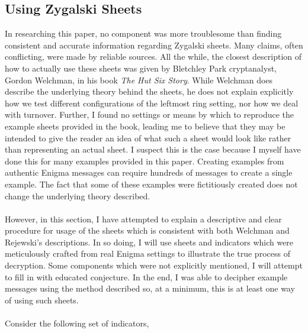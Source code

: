 \subsection{Using Zygalski Sheets}
In researching this paper, no component was more troublesome than
finding consistent and accurate information regarding Zygalski
sheets. Many claims, often conflicting, were made by reliable
sources. All the while, the closest description of how to actually
use these sheets was given by Bletchley Park cryptanalyst, Gordon
Welchman, in his book \emph{The
Hut Six Story}. While Welchman does describe the underlying theory
behind the sheets, he does not explain explicitly how we test
different configurations of the leftmost ring setting, nor how we
deal with turnover. Further, I found no settings or means by which to
reproduce the example sheets provided in the book, leading me to
believe that they may be intended to give the reader an idea of what
such a sheet would look like rather than representing an actual
sheet. I suspect this is the case because I myself have done this for
many examples provided in this paper. Creating examples from
authentic Enigma messages can require hundreds of messages to create
a single example. The fact that some of these examples were
fictitiously created does not change the underlying theory described.
\\\\However, in this section, I have attempted to explain a
descriptive and clear procedure for usage of the sheets which is
consistent with both Welchman and Rejewski's descriptions. In so doing, I
will use sheets and indicators which were meticulously crafted from
real Enigma settings to illustrate the true process of decryption.
Some components which were not explicitly mentioned, I will attempt to
fill in with educated conjecture. In the end, I was able to decipher
example messages using the method described so, at a minimum, this is
at least one way of using such sheets.
\\\\Consider the following set of indicators,
